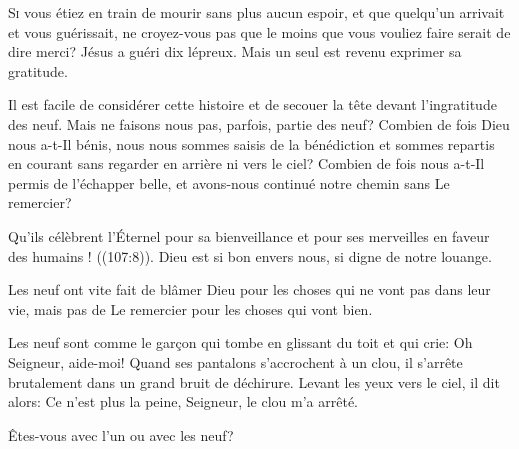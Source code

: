 



\lettrine{S}{i} vous étiez en train de mourir sans plus aucun espoir,
 et que quelqu'un arrivait et vous guérissait, ne croyez-vous pas
 que le moins que vous vouliez faire serait de dire merci?
 Jésus a guéri dix lépreux. Mais un seul est revenu exprimer sa gratitude.

Il est facile de considérer cette histoire et de secouer la tête
 devant l'ingratitude des neuf. Mais ne faisons nous pas, parfois,
 partie des neuf? Combien de fois Dieu nous a-t-Il bénis,
 nous nous sommes saisis de la bénédiction et sommes
 repartis en courant sans regarder en arrière ni vers le ciel?
 Combien de fois nous a-t-Il permis de l'échapper belle,
 et avons-nous continué notre chemin sans Le remercier?


\Og Qu'ils célèbrent l'Éternel pour sa bienveillance
 et pour ses merveilles en faveur des humains ! \Fg{}
 ((107:8)).
 Dieu est si bon envers nous, si digne de notre louange.

Les neuf ont vite fait de blâmer Dieu pour les choses qui ne vont pas
 dans leur vie, mais pas de Le remercier pour les choses qui vont bien.

Les neuf sont comme le gar\c{c}on qui tombe en glissant du toit
 et qui crie: 
 \Og Oh Seigneur, aide-moi! \Fg{} Quand ses pantalons s'accrochent à un clou,
 il s'arrête brutalement dans un grand bruit de déchirure.
 Levant les yeux vers le ciel, il dit alors: 
 \Og Ce n'est plus la peine, Seigneur, le clou m'a arrêté. \Fg{}

Êtes-vous avec l'un ou avec les neuf?

\dvrule



